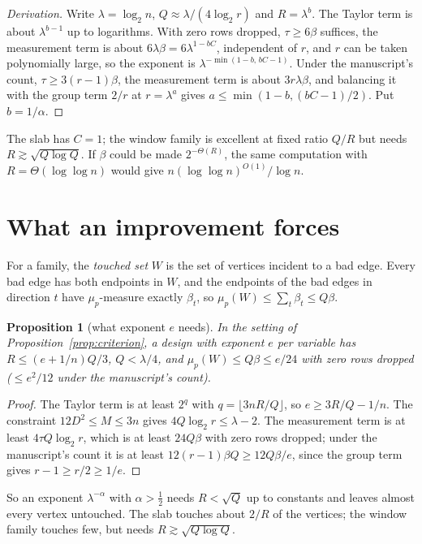 \documentclass[11pt]{article}
\newtheorem{proposition}[theorem]{Proposition}
\theoremstyle{definition}
\theoremstyle{remark}
\begin{document}
\begin{proof}[Derivation]
Write $\lambda=\log_2n$, $Q\approx\lambda/(4\log_2r)$ and $R=\lambda^b$. The Taylor term is about $\lambda^{b-1}$ up to logarithms. With zero rows dropped, $\tau\ge6\beta$ suffices, the measurement term is about $6\lambda\beta=6\lambda^{1-bC}$, independent of $r$, and $r$ can be taken polynomially large, so the exponent is $\lambda^{-\min(1-b,\,bC-1)}$. Under the manuscript's count, $\tau\ge3(r-1)\beta$, the measurement term is about $3r\lambda\beta$, and balancing it with the group term $2/r$ at $r=\lambda^a$ gives $a\le\min(1-b,(bC-1)/2)$. Put $b=1/\alpha$.
\end{proof}

The slab has $C=1$; the window family is excellent at fixed ratio $Q/R$ but needs $R\gtrsim\sqrt{Q\log Q}$. If $\beta$ could be made $2^{-\Theta(R)}$, the same computation with $R=\Theta(\log\log n)$ would give $n(\log\log n)^{O(1)}/\log n$.

\section{What an improvement forces}\label{sec:forces}

For a family, the \emph{touched set} $W$ is the set of vertices incident to a bad edge. Every bad edge has both endpoints in $W$, and the endpoints of the bad edges in direction $t$ have $\mu_p$-measure exactly $\beta_t$, so $\mu_p(W)\le\sum_t\beta_t\le Q\beta$.

\begin{proposition}[what exponent $e$ needs]\label{prop:forces}
In the setting of Proposition~\ref{prop:criterion}, a design with exponent $e$ per variable has $R\le(e+1/n)Q/3$, $Q<\lambda/4$, and $\mu_p(W)\le Q\beta\le e/24$ with zero rows dropped ($\le e^2/12$ under the manuscript's count).
\end{proposition}

\begin{proof}
The Taylor term is at least $2^q$ with $q=\lfloor3nR/Q\rfloor$, so $e\ge3R/Q-1/n$. The constraint $12D^2\le M\le3n$ gives $4Q\log_2r\le\lambda-2$. The measurement term is at least $4\tau Q\log_2r$, which is at least $24Q\beta$ with zero rows dropped; under the manuscript's count it is at least $12(r-1)\beta Q\ge12Q\beta/e$, since the group term gives $r-1\ge r/2\ge1/e$.
\end{proof}

So an exponent $\lambda^{-\alpha}$ with $\alpha>\frac12$ needs $R<\sqrt Q$ up to constants and leaves almost every vertex untouched. The slab touches about $2/R$ of the vertices; the window family touches few, but needs $R\gtrsim\sqrt{Q\log Q}$.
\end{document}
